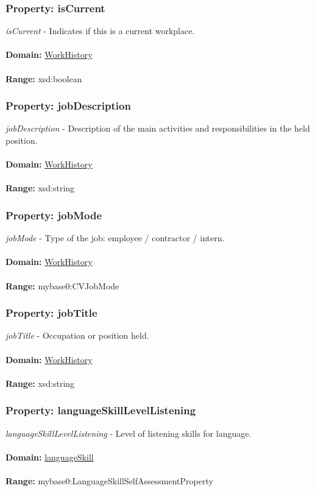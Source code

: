 \documentclass[a4paper,12pt]{article}
\numberwithin{equation}{section}
\begin{document}
\subsubsection{Property: isCurrent}\hypertarget{isCurrent}{}
\textit{isCurrent} - Indicates if this is a current workplace.
\\\\
\textbf{Domain:} \hyperlink{WorkHistory}{WorkHistory} 
\\\\
\textbf{Range:}  xsd:boolean

\subsubsection{Property: jobDescription}\hypertarget{jobDescription}{}
\textit{jobDescription} - Description of the main activities and responsibilities in the held position.
\\\\
\textbf{Domain:} \hyperlink{WorkHistory}{WorkHistory} 
\\\\
\textbf{Range:}  xsd:string

\subsubsection{Property: jobMode}\hypertarget{jobMode}{}
\textit{jobMode} - Type of the job: employee / contractor / intern.
\\\\
\textbf{Domain:} \hyperlink{WorkHistory}{WorkHistory} 
\\\\
\textbf{Range:}  mybase0:CVJobMode

\subsubsection{Property: jobTitle}\hypertarget{jobTitle}{}
\textit{jobTitle} - Occupation or position held.
\\\\
\textbf{Domain:} \hyperlink{WorkHistory}{WorkHistory} 
\\\\
\textbf{Range:}   xsd:string

\subsubsection{Property: languageSkillLevelListening}\hypertarget{languageSkillLevelListening}{}
\textit{languageSkillLevelListening} - Level of listening skills for language.
\\\\
\textbf{Domain:} \hyperlink{languageSkill}{languageSkill} 
\\\\
\textbf{Range:}   mybase0:LanguageSkillSelfAssessmentProperty 
\end{document}
